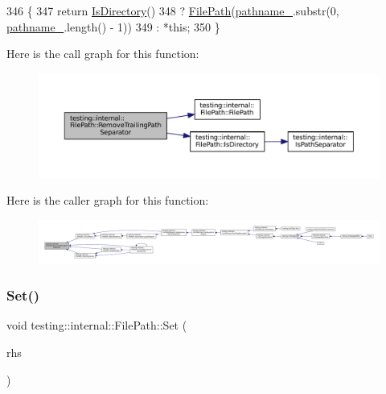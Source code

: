 \begin{DoxyCode}
346                                                      \{
347   \textcolor{keywordflow}{return} \hyperlink{classtesting_1_1internal_1_1FilePath_a73fc042ad65e85bbecb956eb4603a6f2}{IsDirectory}()
348       ? \hyperlink{classtesting_1_1internal_1_1FilePath_a3504a51accbca78a52fe586133ea5499}{FilePath}(\hyperlink{classtesting_1_1internal_1_1FilePath_a12ce28a0015f85604e0372230fa18d6e}{pathname\_}.substr(0, \hyperlink{classtesting_1_1internal_1_1FilePath_a12ce28a0015f85604e0372230fa18d6e}{pathname\_}.length() - 1))
349       : *this;
350 \}
\end{DoxyCode}
Here is the call graph for this function\+:
\nopagebreak
\begin{figure}[H]
\begin{center}
\leavevmode
\includegraphics[width=350pt]{classtesting_1_1internal_1_1FilePath_ab47ada111cc940cf2359f6533bada6ca_cgraph}
\end{center}
\end{figure}
Here is the caller graph for this function\+:
\nopagebreak
\begin{figure}[H]
\begin{center}
\leavevmode
\includegraphics[width=350pt]{classtesting_1_1internal_1_1FilePath_ab47ada111cc940cf2359f6533bada6ca_icgraph}
\end{center}
\end{figure}
\mbox{\label{classtesting_1_1internal_1_1FilePath_a15a42de7518e89254e0640dd9317d5f7}} 
\subsubsection{\texorpdfstring{Set()}{Set()}}
{\footnotesize\ttfamily void testing\+::internal\+::\+File\+Path\+::\+Set (\begin{DoxyParamCaption}\item[{const \hyperlink{classtesting_1_1internal_1_1FilePath}{File\+Path} \&}]{rhs }\end{DoxyParamCaption})\hspace{0.3cm}{\ttfamily [inline]}}



